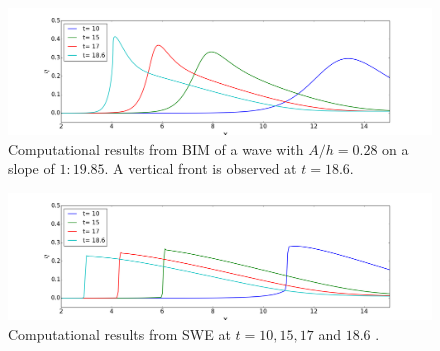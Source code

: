 \documentclass[review]{elsarticle}
\begin{document}
\begin{figure}[!htb]
\centering
\includegraphics[width=\textwidth]{_fig/bim_n7_time_series.png}
\caption{Computational results from BIM of a wave with $A/h=0.28$ 
on a slope of $1:19.85$.
A vertical front is observed at $t=18.6$. }
\label{fig:bim_breaking}
\end{figure}




\begin{figure}[!htb]
\centering
\includegraphics[width=\textwidth]{_fig/sw_dx05_time_series.png}
\caption{Computational results from SWE at $t=10,15,17$ and $18.6$ .  }
\label{fig:sw_timeseries}
\end{figure}

\end{document}
